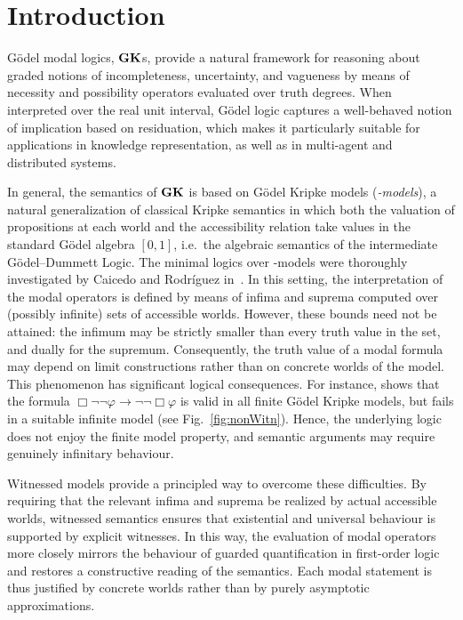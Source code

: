 
\section{Introduction}\label{sec:intro}

G\"odel modal logics, $\mathbf{GK}$s, provide a natural framework for reasoning
about graded notions of incompleteness, uncertainty, and vagueness by
means of necessity and possibility operators evaluated over truth
degrees. When interpreted over the real unit interval, G\"odel logic
captures a well-behaved notion of implication based on residuation,
which makes it particularly suitable for applications in knowledge
representation, as well as in multi-agent and distributed systems.


In general, the semantics of $\mathbf{GK}$ is based on G\"odel Kripke models
(\emph{\GM-models}), a natural generalization of classical Kripke
semantics in which both the valuation of propositions at each world
and the accessibility relation take values in the standard G\"odel
algebra $[0,1]$, i.e.\ the algebraic semantics of the intermediate
G\"odel--Dummett Logic. The minimal logics over {\GM-models} were
thoroughly investigated by Caicedo and Rodr\'iguez
in~\cite{CaiRod2010,CaiRod2015}.  In this setting, the interpretation
of the modal operators is defined by means of infima and suprema
computed over (possibly infinite) sets of accessible worlds. However,
these bounds need not be attained: the infimum may be strictly smaller
than every truth value in the set, and dually for the
supremum. Consequently, the truth value of a modal formula may depend
on limit constructions rather than on concrete worlds of the model.
This phenomenon has significant logical consequences. For instance,
\cite{CaiRod2010} shows that the formula $\Box \neg \neg \varphi \to
\neg \neg \Box \varphi$ is valid in all finite G\"odel Kripke models,
but fails in a suitable infinite model (see
Fig.~\ref{fig:nonWitn}). Hence, the underlying logic does not enjoy the
finite model property, and semantic arguments may require genuinely
infinitary behaviour.

Witnessed models provide a principled way to overcome these
difficulties. By requiring that the relevant infima and suprema be
realized by actual accessible worlds, witnessed semantics ensures that
existential and universal behaviour is supported by explicit
witnesses. In this way, the evaluation of modal operators more closely
mirrors the behaviour of guarded quantification in first-order logic
and restores a constructive reading of the semantics. Each modal
statement is thus justified by concrete worlds rather than by purely
asymptotic approximations.

